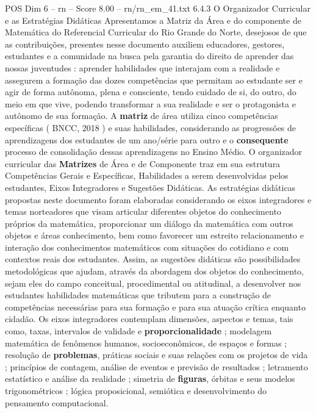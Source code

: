 \begin{textsample}{POS Dim 6 – rn – Score 8.00 – rn/rn\_em\_41.txt}  \label{ex:f6_pos_234}
6.4.3 O Organizador Curricular e as Estratégias Didáticas Apresentamos a Matriz da Área e do componente de Matemática do Referencial Curricular do Rio Grande do Norte, desejosos de que as contribuições, presentes nesse documento auxiliem educadores, gestores, estudantes e a comunidade na busca pela garantia do direito de aprender das nossas juventudes : aprender habilidades que interajam com a realidade e assegurem a formação das dozes competências que permitam ao estudante ser e agir de forma autônoma, plena e consciente, tendo cuidado de si, do outro, do meio em que vive, podendo transformar a sua realidade e ser o protagonista e autônomo de sua formação.
A \textbf{matriz} de área utiliza cinco competências específicas ( BNCC, 2018 ) e suas habilidades, considerando as progressões de aprendizagens dos estudantes de um ano/série para outro e o \textbf{consequente} processo de consolidação dessas aprendizagens no Ensino Médio.
O organizador curricular das \textbf{Matrizes} de Área e de Componente traz em sua estrutura Competências Gerais e Específicas, Habilidades a serem desenvolvidas pelos estudantes, Eixos Integradores e Sugestões Didáticas.
As estratégias didáticas propostas neste documento foram elaboradas considerando os eixos integradores e temas norteadores que visam articular diferentes objetos do conhecimento próprios da matemática, proporcionar um diálogo da matemática com outros objetos e áreas conhecimento, bem como favorecer um estreito relacionamento e interação dos conhecimentos matemáticos com situações do cotidiano e com contextos reais dos estudantes.
Assim, as sugestões didáticas são possibilidades metodológicas que ajudam, através da abordagem dos objetos do conhecimento, sejam eles do campo conceitual, procedimental ou atitudinal, a desenvolver nos estudantes habilidades matemáticas que tributem para a construção de competências necessárias para sua formação e para sua atuação crítica enquanto cidadão.
Os eixos integradores contemplam dimensões, aspectos e temas, tais como, taxas, intervalos de validade e \textbf{proporcionalidade} ; modelagem matemática de fenômenos humanos, socioeconômicos, de espaços e formas ; resolução de \textbf{problemas}, práticas sociais e suas relações com os projetos de vida ; princípios de contagem, análise de eventos e previsão de resultados ; letramento estatístico e análise da realidade ; simetria de \textbf{figuras}, órbitas e seus modelos trigonométricos ; lógica proposicional, semiótica e desenvolvimento do pensamento computacional.

\end{textsample}
